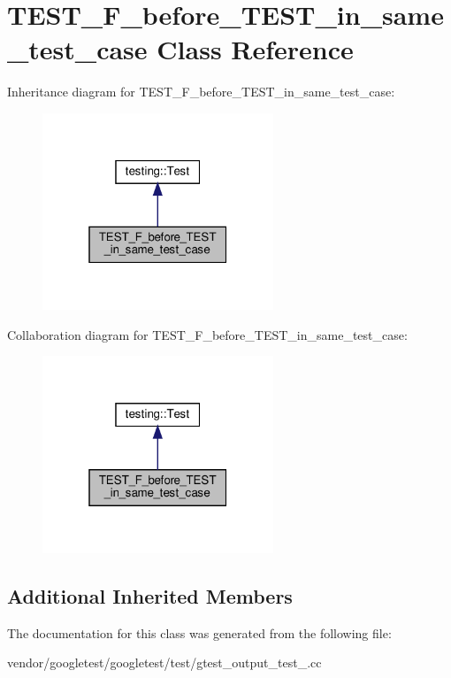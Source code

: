 \hypertarget{class_t_e_s_t___f__before___t_e_s_t__in__same__test__case}{}\section{T\+E\+S\+T\+\_\+\+F\+\_\+before\+\_\+\+T\+E\+S\+T\+\_\+in\+\_\+same\+\_\+test\+\_\+case Class Reference}
\label{class_t_e_s_t___f__before___t_e_s_t__in__same__test__case}


Inheritance diagram for T\+E\+S\+T\+\_\+\+F\+\_\+before\+\_\+\+T\+E\+S\+T\+\_\+in\+\_\+same\+\_\+test\+\_\+case\+:
\nopagebreak
\begin{figure}[H]
\begin{center}
\leavevmode
\includegraphics[width=196pt]{class_t_e_s_t___f__before___t_e_s_t__in__same__test__case__inherit__graph}
\end{center}
\end{figure}


Collaboration diagram for T\+E\+S\+T\+\_\+\+F\+\_\+before\+\_\+\+T\+E\+S\+T\+\_\+in\+\_\+same\+\_\+test\+\_\+case\+:
\nopagebreak
\begin{figure}[H]
\begin{center}
\leavevmode
\includegraphics[width=196pt]{class_t_e_s_t___f__before___t_e_s_t__in__same__test__case__coll__graph}
\end{center}
\end{figure}
\subsection*{Additional Inherited Members}


The documentation for this class was generated from the following file\+:\begin{DoxyCompactItemize}
\item 
vendor/googletest/googletest/test/gtest\+\_\+output\+\_\+test\+\_\+.\+cc\end{DoxyCompactItemize}
